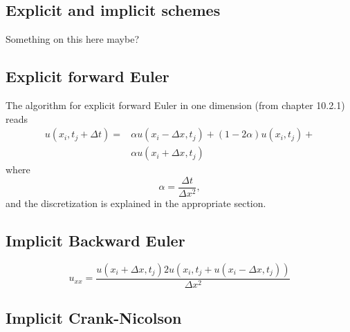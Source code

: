 \documentclass[reprint, english,notitlepage,nofootinbib]{revtex4-1}  %
\begin{document}
\subsection*{Explicit and implicit schemes}

Something on this here maybe?

\subsection*{Explicit forward Euler}


The algorithm for explicit forward Euler in one dimension (from \cite{lectures2015} chapter 10.2.1) reads
\begin{align*}
	u(x_i, t_j+\Delta t) = &\alpha u(x_i - \Delta x, t_j) + (1-2\alpha) u(x_i,t_j) + \\
	& \alpha u(x_i + \Delta x, t_j)
\end{align*}
where
\begin{equation*}
	\alpha = \frac{\Delta t}{\Delta x^2},
\end{equation*}
and the discretization is explained in the appropriate section.


\subsection*{Implicit Backward Euler}

\begin{equation}
	u_{xx} = \frac{u(x_i + \Delta x, t_j)2u(x_i,t_j + u(x_i-\Delta x, t_j))}{\Delta x^2}
\end{equation}


\subsection*{Implicit Crank-Nicolson}
\end{document}
